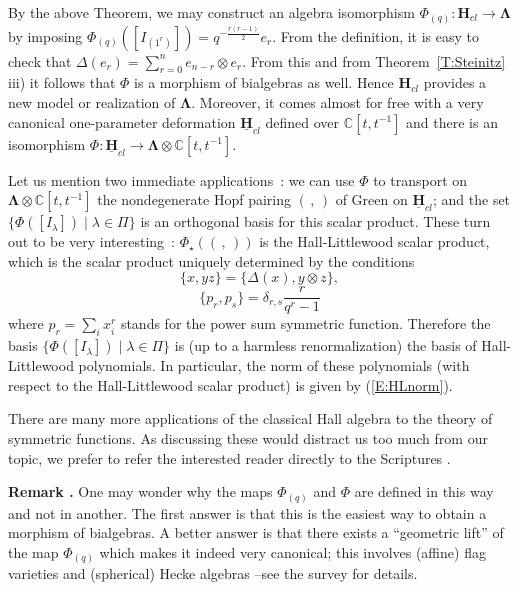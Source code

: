 \documentclass[a4paper,10pt]{amsart}
\def\H{\mathbf{H}}
\def\C{\mathbb{C}}
\def\LLambda{\boldsymbol{\Lambda}}
\numberwithin{equation}{section}
\begin{document}
\vspace{.1in}

By the above Theorem, we may construct an algebra isomorphism $\Phi_{(q)}: \H_{cl} \to \LLambda$ by imposing
$\Phi_{(q)}([I_{(1^r)}])=q^{-\frac{r (r-1)}{2}}e_r$.  From the definition, it is easy to check that
$\Delta(e_r)=\sum_{r=0}^n e_{n-r} \otimes e_r$. From this and from Theorem~\ref{T:Steinitz} iii) it follows that $\Phi$ is a morphism of bialgebras as well. Hence $\H_{cl}$ provides a new model or realization of $\LLambda$. Moreover, it comes almost for free with a very canonical one-parameter deformation $\underline{\H}_{cl}$ defined over $\C[t,t^{-1}]$ and there is an isomorphism $\Phi: \underline{\H}_{cl} \to \LLambda \otimes \C[t,t^{-1}]$.

\vspace{.1in}

Let us mention two immediate applications~: we can use $\Phi$ to transport on $\LLambda \otimes \C[t,t^{-1}]$ the nondegenerate Hopf pairing $(\,,\,)$ of Green on $\underline{\H}_{cl}$; and the set $\{\Phi([I_{\lambda}])\;|\; \lambda \in \Pi\}$ is an orthogonal basis for this scalar product. These turn out to be very interesting~: $\Phi_{\star}((\,,\,))$ is the Hall-Littlewood scalar product, which is the scalar product uniquely determined by the conditions
$$\{x,yz\}=\{\Delta(x) ,y\otimes z\},$$
\begin{equation}\label{E:HLscalarprod}
\{p_r,p_s\}=\delta_{r,s}\frac{r}{q^r-1}
\end{equation}
where $p_r=\sum_i x_i^r$ stands for the power sum symmetric function. Therefore the basis $\{\Phi([I_{\lambda}])\;|\; \lambda \in \Pi\}$ is (up to a harmless renormalization) the basis of Hall-Littlewood polynomials. In particular, the norm of these polynomials (with respect to the Hall-Littlewood scalar product) is given by (\ref{E:HLnorm}).

 There are many more applications of the classical Hall algebra to the theory of symmetric functions. As discussing these would distract us too much from our topic, we prefer to refer the interested reader directly to the Scriptures \cite{Mac}.

\vspace{.2in}

\addtocounter{theo}{1}
\noindent \textbf{Remark \thetheo .}  One may wonder why the maps $\Phi_{(q)}$ and $\Phi$ are defined in this way and not in another. The first answer is that this is the easiest way to obtain a morphism of bialgebras. A better answer is that there exists a ``geometric lift'' of the map $\Phi_{(q)}$ which makes it indeed very canonical; this involves (affine) flag varieties and (spherical) Hecke algebras --see the survey \cite{SToronto} for details.
\end{document}
